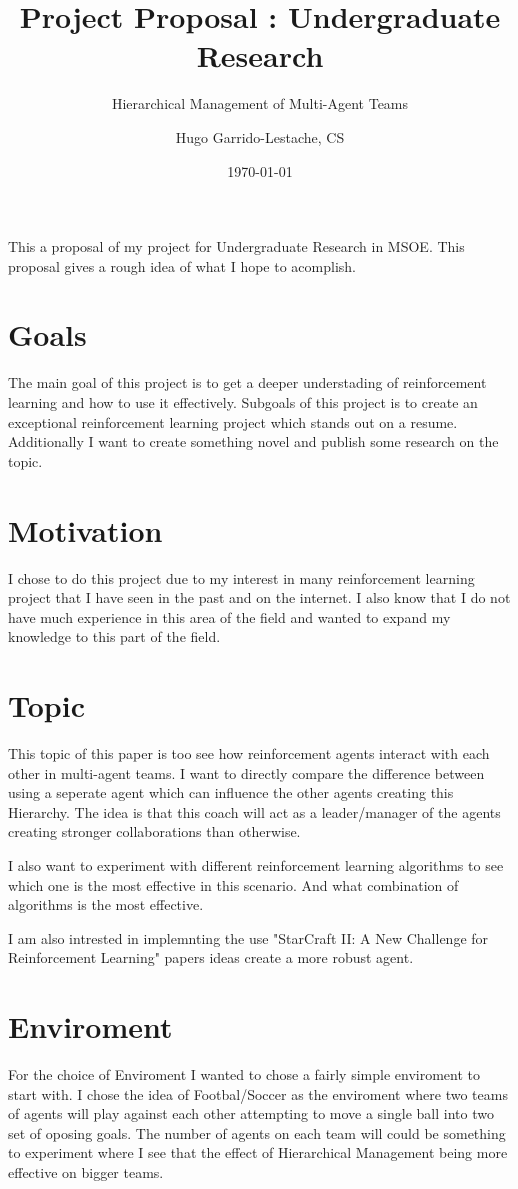 \documentclass[12pt]{article}
\title{Project Proposal : Undergraduate Research}
\subtitle{Hierarchical Management of Multi-Agent Teams}
\author{Hugo Garrido-Lestache, CS}
\date{\today}
\begin{document}
\maketitle

This a proposal of my project for Undergraduate Research in MSOE.
This proposal gives a rough idea of what I hope to acomplish.

\section{Goals}
The main goal of this project is to get a deeper understading of reinforcement learning and how to use it effectively.
Subgoals of this project is to create an exceptional reinforcement learning project which stands out on a resume.
Additionally I want to create something novel and publish some research on the topic.

\section{Motivation}
I chose to do this project due to my interest in many reinforcement learning project that I have seen in the past and on the internet.
I also know that I do not have much experience in this area of the field and wanted to expand my knowledge to this part of the field.

\section{Topic}
This topic of this paper is too see how reinforcement agents interact with each other in multi-agent teams.
I want to directly compare the difference between using a seperate agent which can influence the other agents creating this Hierarchy.
The idea is that this coach will act as a leader/manager of the agents creating stronger collaborations than otherwise.

I also want to experiment with different reinforcement learning algorithms to see which one is the most effective in this scenario.
And what combination of algorithms is the most effective.

I am also intrested in implemnting the use "StarCraft II: A New Challenge for Reinforcement Learning" papers ideas create a more robust agent.

\section{Enviroment}
For the choice of Enviroment I wanted to chose a fairly simple enviroment to start with.
I chose the idea of Footbal/Soccer as the enviroment where two teams of agents will play against each other attempting to move a single ball into two set of oposing goals.
The number of agents on each team will could be something to experiment where I see that the effect of Hierarchical Management being more effective on bigger teams.
\end{document}
